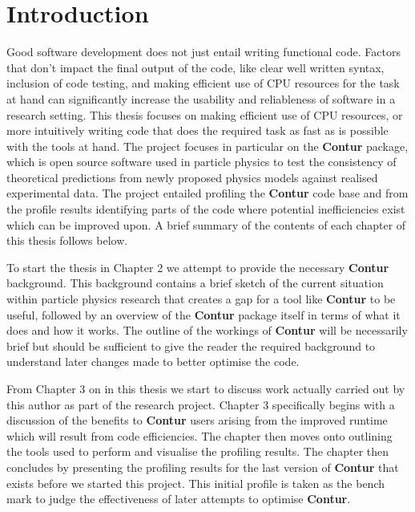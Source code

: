 \chapter{Introduction}
\label{chapterlabel1}

Good software development does not just entail writing functional code. Factors that don't impact the final output of the code, like clear well written syntax, inclusion of code testing, and making efficient use of CPU resources for the task at hand can significantly increase the usability and reliableness of software in a research setting. This thesis focuses on making efficient use of CPU resources, or more intuitively writing code that does the required task as fast as is possible with the tools at hand. The project focuses in particular on the \textbf{Contur} package, which is open source software used in particle physics to test the consistency of theoretical predictions from newly proposed physics models against realised experimental data. The project entailed profiling the \textbf{Contur}  code base and from the profile results identifying parts of the code where potential inefficiencies exist which can be improved upon. A brief summary of the contents of each chapter of this thesis follows below.

To start the thesis in Chapter 2 we attempt to provide the necessary \textbf{Contur} background. This background contains a brief sketch of the current situation within particle physics research that creates a gap for a tool like \textbf{Contur} to be useful, followed by an overview of the \textbf{Contur}  package itself in terms of what it does and how it works. The outline of the workings of \textbf{Contur}  will be necessarily brief but should be sufficient to give the reader the required background to understand later changes made to better optimise the code.

From Chapter 3 on in this thesis we start to discuss work actually carried out by this author as part of the research project. Chapter 3 specifically begins with a discussion of the benefits to \textbf{Contur} users arising from the improved runtime which will result from code efficiencies. The chapter then moves onto outlining the tools used to perform and visualise the profiling results. The chapter then concludes by presenting the profiling results for the last version of \textbf{Contur} that exists before we started this project. This initial profile is taken as the bench mark to judge the effectiveness of later attempts to optimise \textbf{Contur}.

